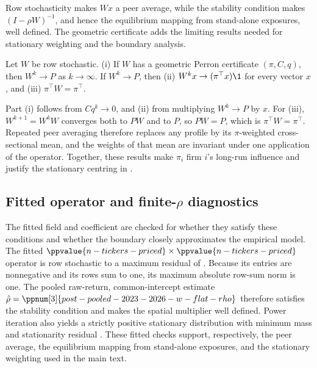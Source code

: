 Row stochasticity makes $Wx$ a peer average, while the stability condition
makes $(I-\rho W)^{-1}$, and hence the equilibrium mapping from stand-alone
exposures, well defined.
The geometric certificate adds the limiting results needed for stationary
weighting and the boundary analysis.

\begin{theorem}
  \label{thm:perron-from-geometric}\label{thm:replication-centrality}
  \label{thm:stationarity}
  Let $W$ be row stochastic.
  (i) If $W$ has a geometric Perron certificate $(\pi,C,q)$, then $W^k\to P$
  as $k\to\infty$.
  If $W^k\to P$, then (ii) $W^k x\to(\pi^\top x)\1$ for every vector $x$, and
  (iii) $\pi^\top W=\pi^\top$.
\end{theorem}
Part (i) follows from $Cq^k\to0$, and (ii) from multiplying $W^k\to P$ by
$x$.
For (iii), $W^{k+1}=W^{k}W$ converges both to $PW$ and to $P$, so $PW=P$, which
is $\pi^\top W=\pi^\top$.
Repeated peer averaging therefore replaces any profile by its $\pi$-weighted
cross-sectional mean, and the weights of that mean are invariant under one
application of the operator.
Together, these results make $\pi_i$ firm $i$'s long-run influence and justify
the stationary centring in .

\subsection{Fitted operator and finite-\texorpdfstring{$\rho$}{rho} diagnostics}
\label{sec:app-network-diagnostics}

The fitted field and coefficient are checked for whether they
satisfy these conditions and whether the boundary closely approximates the
empirical model.
The fitted $\ppvalue{n-tickers-priced}\times\ppvalue{n-tickers-priced}$
operator is row stochastic to a maximum residual of
.
Because its entries are nonnegative and its rows sum to one, its maximum
absolute row-sum norm is one.
The pooled raw-return, common-intercept estimate
$\hat\rho=\ppnum[3]{post-pooled-2023-2026-w-flat-rho}$ therefore satisfies the
stability condition and makes the spatial multiplier well defined.
Power iteration also yields a strictly positive stationary distribution with
minimum mass  and stationarity residual
.
These fitted checks support, respectively, the peer average, the equilibrium
mapping from stand-alone exposures, and the stationary weighting used in the
main text.


